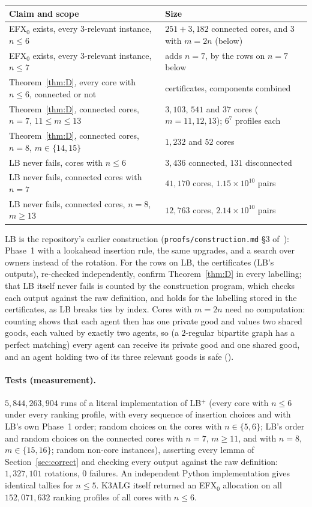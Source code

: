 \documentclass[runningheads,11pt]{llncs}
\newcommand{\efxz}{\texorpdfstring{\mbox{EFX$_0$}}{EFX0}}
\newcommand{\LBp}{\texorpdfstring{\mbox{LB$^{+}$}}{LB+}}
\begin{document}
\medskip
\noindent\begin{tabular}{@{}p{}p{}@{}}
\toprule
Claim and scope & Size \\
\midrule
\efxz{} exists, every $3$-relevant instance, $n\le6$ & $251+3{,}182$ connected cores, and $3$ with $m=2n$ (below) \\
\efxz{} exists, every $3$-relevant instance, $n\le7$ & adds $n=7$, by the rows on $n=7$ below \\
Theorem~\ref{thm:D}, every core with $n\le6$, connected or not & certificates, components combined \\
Theorem~\ref{thm:D}, connected cores, $n=7$, $11\le m\le13$ & $3{,}103$, $541$ and $37$ cores ($m=11,12,13$); $6^7$ profiles each \\
Theorem~\ref{thm:D}, connected cores, $n=8$, $m\in\{14,15\}$ & $1{,}232$ and $52$ cores \\
LB never fails, cores with $n\le6$ & $3{,}436$ connected, $131$ disconnected \\
LB never fails, connected cores with $n=7$ & $41{,}170$ cores, $1.15\times10^{10}$ pairs \\
LB never fails, connected cores, $n=8$, $m\ge13$ & $12{,}763$ cores, $2.14\times10^{10}$ pairs \\
\bottomrule
\end{tabular}
\medskip

\noindent LB is the repository's earlier construction (\texttt{proofs/construction.md} \S3 of~\cite{Repo}): Phase~1 with a lookahead insertion rule, the same upgrades, and a search over owners instead of the rotation. For the rows on LB, the certificates (LB's outputs), re-checked independently, confirm Theorem~\ref{thm:D} in every labelling; that LB itself never fails is counted by the construction program, which checks each output against the raw definition, and holds for the labelling stored in the certificates, as LB breaks ties by index. Cores with $m=2n$ need no computation: counting shows that each agent then has one private good and values two shared goods, each valued by exactly two agents, so (a $2$-regular bipartite graph has a perfect matching) every agent can receive its private good and one shared good, and an agent holding two of its three relevant goods is safe ().

\paragraph{Tests (measurement).} $5{,}844{,}263{,}904$ runs of a literal implementation of \LBp{} (every core with $n\le6$ under every ranking profile, with every sequence of insertion choices and with LB's own Phase~1 order; random choices on the cores with $n\in\{5,6\}$; LB's order and random choices on the connected cores with $n=7$, $m\ge11$, and with $n=8$, $m\in\{15,16\}$; random non-core instances), asserting every lemma of Section~\ref{sec:correct} and checking every output against the raw definition: $1{,}327{,}101$ rotations, $0$ failures. An independent Python implementation gives identical tallies for $n\le5$. K3ALG itself returned an \efxz{} allocation on all $152{,}071{,}632$ ranking profiles of all cores with $n\le6$.
\end{document}
